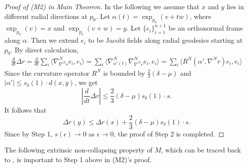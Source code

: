 \documentclass{amsart}
\numberwithin{equation}{section}
\theoremstyle{remark}
\renewcommand{\(}{\left(}
\renewcommand{\)}{\right)}
\renewcommand{\~}{\tilde}
\renewcommand{\-}{\overline}
\renewcommand{\d}{\delta}
\newcommand{\e}{\epsilon}
\begin{document}
\begin{proof}[Proof of (M2) in Main Theorem]
	In the following we assume that $x$ and $y$ lies in different radial directions at $p_0$.
	Let $\alpha(t)=\exp_{p_0}(v+tw)$, where $\exp_{p_0}(v)=x$ and $\exp_{p_0}(v+w)=y$. Let $\{e_i\}_{i=1}^{n+1}$ be an orthonormal frame along $\alpha$. Then we extend $e_i$ to be Jacobi fields along radial geodesics starting at $p_0$. By direct calculation,
	\begin{align*}
	\frac{d}{d t}\Delta r  = \frac{d }{d t}\sum_i\langle  \nabla^N_{\nabla^N r}e_i,e_i\rangle 
	= \sum_i\langle  \nabla^N_{\alpha'(t)}\nabla^N_{\nabla^N r}e_i,e_i\rangle 
	=\sum_i\langle   R^N(\alpha',\nabla^N r)e_i,e_i\rangle 
	\end{align*}
	Since the curvature operator $R^N$ is bounded by $\frac{2}{3}(\d-\mu)$ and $|\alpha'|\le s_\d(1)\cdot d(x,y)$, we get
	$$
	\left|\frac{d}{dt}\Delta r\right|\le \frac{2}{3}(\d-\mu)s_\d(1)\cdot s.
	$$
	It follows that
	$$\Delta r(y)\le \Delta r(x) +\frac{2}{3}(\d-\mu)s_\d(1)\cdot s.$$
	Since by Step 1, $s(\e)\to 0$ as $\e\to 0$, the proof of Step 2 is completed.
\end{proof}

The following extrinsic non-collapsing property of $M$, which can be traced back to \cite[Proposition 1.12]{Colding-Minicozzi-book}, is important to Step 1 above in (M2)'s proof.
\end{document}
